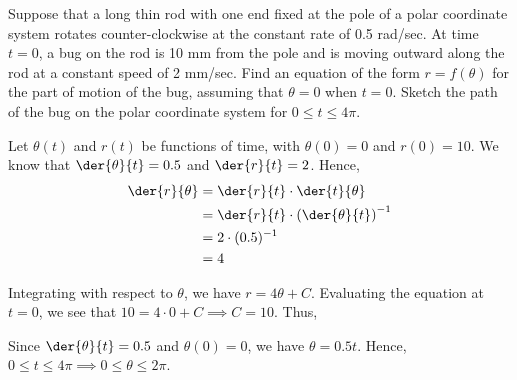 \documentclass{jhwhw}
\begin{document}
    \problem{}
        Suppose that a long thin rod with one end fixed at the pole of a polar coordinate system rotates counter-clockwise at the constant rate of 0.5 rad/sec. At time $t = 0$, a bug on the rod is 10 mm from the pole and is moving outward along the rod at a constant speed of 2 mm/sec. Find an equation of the form $r = f(\theta)$ for the part of motion of the bug, assuming that $\theta = 0$ when $t = 0$. Sketch the path of the bug on the polar coordinate system for $0 \leq t \leq 4\pi$.

    \solution
        Let $\theta(t)$ and $r(t)$ be functions of time, with $\theta(0) = 0$ and $r(0) = 10$. We know that $\der{\theta}{t} = 0.5$ and $\der{r}{t} = 2$. Hence,
        \begin{align*}
            \der{r}{\theta} &= \der{r}{t} \cdot \der{t}{\theta} \\
            &= \der{r}{t} \cdot \left(\der{\theta}{t}\right)^{-1}\\
            &= 2 \cdot (0.5)^{-1}\\
            &= 4
        \end{align*}

        Integrating with respect to $\theta$, we have $r = 4\theta + C$. Evaluating the equation at $t=0$, we see that $10 = 4\cdot 0 + C \implies C = 10$. Thus,


        Since $\der{\theta}{t} = 0.5$ and $\theta(0) = 0$, we have $\theta = 0.5t$. Hence, $0 \leq t \leq 4\pi \implies 0 \leq \theta \leq 2\pi$.

        \begin{center}
        \end{center}
\end{document}
